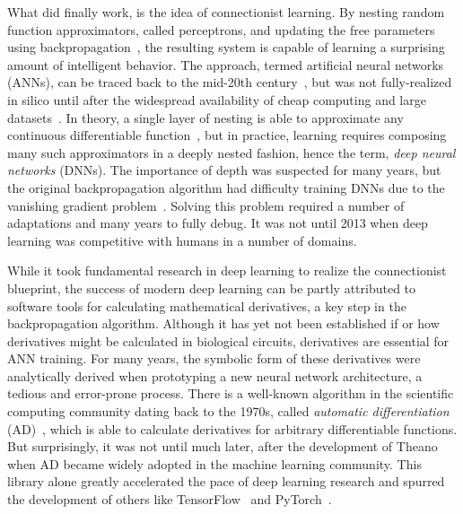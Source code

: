 \documentclass[12pt,initial,twoside,maitrise]{dms}
\numberwithin{equation}{section}
\numberwithin{table}{chapter}
\numberwithin{figure}{chapter}
\begin{document}
What did finally work, is the idea of connectionist learning. By nesting random function approximators, called perceptrons, and updating the free parameters using backpropagation~\citep{werbos1990backpropagation, rumelhart1988learning}, the resulting system is capable of learning a surprising amount of intelligent behavior. The approach, termed artificial neural networks (ANNs), can be traced back to the mid-20th century~\citep{ivakhnenko1965cybernetic, rosenblatt1958perceptron}, but was not fully-realized in silico until after the widespread availability of cheap computing and large datasets~\citep{lecun2015deep}. In theory, a single layer of nesting is able to approximate any continuous differentiable function~\citep{hornik1989multilayer}, but in practice, learning requires composing many such approximators in a deeply nested fashion, hence the term, \textit{deep neural networks} (DNNs). The importance of depth was suspected for many years, but the original backpropagation algorithm had difficulty training DNNs due to the vanishing gradient problem~\citep{bengio1994learning}. Solving this problem required a number of adaptations and many years to fully debug. It was not until 2013 when deep learning was competitive with humans in a number of domains.

While it took fundamental research in deep learning to realize the connectionist blueprint, the success of modern deep learning can be partly attributed to software tools for calculating mathematical derivatives, a key step in the backpropagation algorithm. Although it has yet not been established if or how derivatives might be calculated in biological circuits, derivatives are essential for ANN training. For many years, the symbolic form of these derivatives were analytically derived when prototyping a new neural network architecture, a tedious and error-prone process. There is a well-known algorithm in the scientific computing community dating back to the 1970s, called \textit{automatic differentiation} (AD)~\citep{linnainmaa1970representation, griewank1989automatic}, which is able to calculate derivatives for arbitrary differentiable functions. But surprisingly, it was not until much later, after the development of Theano~\citep{theano} when AD became widely adopted in the machine learning community. This library alone greatly accelerated the pace of deep learning research and spurred the development of others like TensorFlow~\citep{abadi2016tensorflow} and PyTorch~\citep{paszke2017automatic}.
\end{document}
